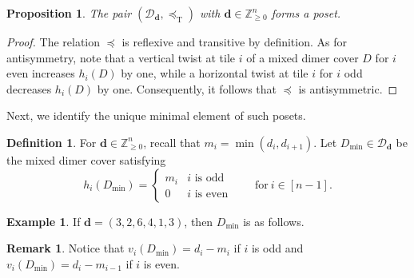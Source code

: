 \documentclass{amsart}
\newtheorem{proposition}[theorem]{Proposition}
\theoremstyle{definition}
\newtheorem{definition}[theorem]{Definition}
\newtheorem{example}[theorem]{Example}
\newtheorem{remark}[theorem]{Remark}
\newcommand{\leqt}{\preceq_{\text{T}}}
\begin{document}
\begin{proposition}\label{prop:poset}
The pair $(\mathcal{D}_{\mathbf{d}},\leqt)$ with $\mathbf{d}\in\mathbb{Z}^n_{\ge 0}$ forms a poset.
\end{proposition}

\begin{proof}
    The relation $\preceq$ is reflexive and transitive by definition. As for antisymmetry, note that a vertical twist at tile $i$ of a mixed dimer cover $D$ for $i$ even increases $h_i(D)$ by one, while a horizontal twist at tile $i$ for $i$ odd decreases $h_i(D)$ by one. Consequently, it follows that $\preceq$ is antisymmetric.
\end{proof}

 Next, we identify the unique minimal element of such posets.

\begin{definition}\label{def:Dmin}
For $\mathbf{d}\in\mathbb{Z}_{\ge 0}^n$, 
recall that $m_i=\min(d_i,d_{i+1})$.
Let $D_{\min} \in \mathcal{D}_{\mathbf{d}}$ be the mixed dimer cover satisfying \[
h_i(D_{\min}) = \begin{cases} m_i & i \text{ is odd}\\
0 & i \text{ is even}
\end{cases} \qquad \text{for}~i\in [n-1].
\]
\end{definition}

\begin{example}\label{ex:Dmin}
If $\mathbf{d} = (3,2,6,4,1,3)$, then $D_{\min}$ is as follows.

\begin{center}
\end{center}
\end{example}

\begin{remark}\label{rmk:MultiplicityOfVertInDMin}
Notice that $v_i(D_{\min}) = d_i - m_i$ if $i$ is odd and $v_i(D_{\min}) = d_i - m_{i-1}$ if $i$ is even. 
\end{remark}
\end{document}

